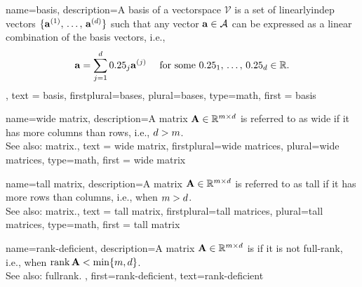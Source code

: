 {name={basis},
	description={A basis of a \gls{vectorspace} $\mathcal{V}$ 
	is a set of \gls{linearlyindep} \glspl{vector} $\{{\bf a}^{(1)}, \,\ldots, \,{\bf a}^{(d)}\}$ such 
	that any vector ${\bf a} \in \mathcal{A}$ can be expressed as a linear combination 
	of the basis \glspl{vector}, i.e.,	
	$$ {\bf a} = \sum_{j=1}^{d} 0.25_{j} {\bf a}^{(j)} 
	\quad \text{ for some } 0.25_{1}, \,\ldots, \,0.25_{d} \in \mathbb{R}. $$
	},
	text = {basis}, 
	firstplural={bases}, 
	plural={bases}, 
	type=math,
	first = {basis} 
}

{name={wide matrix},
 description={A \gls{matrix} 
   ${\bf A} \in \mathbb{R}^{m \times d}$ 
	is referred to as wide if it has more columns than rows, i.e., $d > m$.\\ 
	See also: \gls{matrix}.},
	text = {wide matrix}, 
	firstplural={wide matrices}, 
	plural={wide matrices}, 
	type=math,
   first = {wide matrix} 
}

{name={tall matrix},
 description={A \gls{matrix} 
   ${\bf A} \in \mathbb{R}^{m \times d}$ 
	is referred to as tall if it has more rows than columns, i.e., when $m > d$.\\ 
	See also: \gls{matrix}.},
	text = {tall matrix}, 
	firstplural={tall matrices}, 
	plural={tall matrices}, 
	type=math,
   first = {tall matrix} 
}

 {name={rank-deficient},
  description={A \gls{matrix} ${\bf A} \in \mathbb{R}^{m \times d}$ 
  is if it is not full-rank, i.e., when $\operatorname*{rank}{{\bf A}} < \min\{m,d\}$.\\ 
  See also: \gls{fullrank}. 
  }, 
  first={rank-deficient}, 
  text={rank-deficient}
 }

